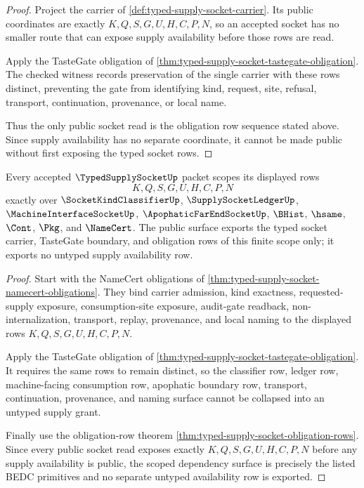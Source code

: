\begin{proof}
Project the carrier of \autoref{def:typed-supply-socket-carrier}. Its public coordinates are exactly $K,Q,S,G,U,H,C,P,N$, so an accepted socket has no smaller route that can expose supply availability before those rows are read.

Apply the TasteGate obligation of \autoref{thm:typed-supply-socket-tastegate-obligation}. The checked witness records preservation of the single carrier with these rows distinct, preventing the gate from identifying kind, request, site, refusal, transport, continuation, provenance, or local name.

Thus the only public socket read is the obligation row sequence stated above. Since supply availability has no separate coordinate, it cannot be made public without first exposing the typed socket rows.
\end{proof}

\begin{theorem}
\label{thm:typed-supply-socket-scope-rows}
Every accepted $\TypedSupplySocketUp$ packet scopes its displayed rows
$$
K,Q,S,G,U,H,C,P,N
$$
exactly over $\SocketKindClassifierUp$, $\SupplySocketLedgerUp$, $\MachineInterfaceSocketUp$, $\ApophaticFarEndSocketUp$, $\BHist$, $\hsame$, $\Cont$, $\Pkg$, and $\NameCert$. The public surface exports the typed socket carrier, TasteGate boundary, and obligation rows of this finite scope only; it exports no untyped supply availability row.
\end{theorem}
\begin{proof}
Start with the NameCert obligations of \autoref{thm:typed-supply-socket-namecert-obligations}. They bind carrier admission, kind exactness, requested-supply exposure, consumption-site exposure, audit-gate readback, non-internalization, transport, replay, provenance, and local naming to the displayed rows $K,Q,S,G,U,H,C,P,N$.

Apply the TasteGate obligation of \autoref{thm:typed-supply-socket-tastegate-obligation}. It requires the same rows to remain distinct, so the classifier row, ledger row, machine-facing consumption row, apophatic boundary row, transport, continuation, provenance, and naming surface cannot be collapsed into an untyped supply grant.

Finally use the obligation-row theorem \autoref{thm:typed-supply-socket-obligation-rows}. Since every public socket read exposes exactly $K,Q,S,G,U,H,C,P,N$ before any supply availability is public, the scoped dependency surface is precisely the listed BEDC primitives and no separate untyped availability row is exported.
\end{proof}

